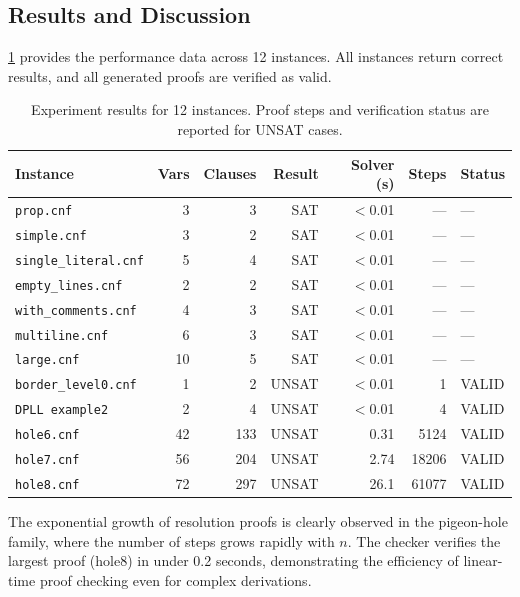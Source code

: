 \documentclass{article}
\begin{document}
\subsection{Results and Discussion}

\cref{tab:results} provides the performance data across 12 instances.
All instances return correct results, and all generated proofs are
verified as valid.

\begin{table}[htb]
\centering
\caption{Experiment results for 12 instances. Proof steps and
verification status are reported for UNSAT cases.}
\label{tab:results}
\begin{tabular}{lrrrrrl}
\toprule
Instance & Vars & Clauses & Result & Solver (s) & Steps & Status \\
\midrule
\texttt{prop.cnf}            &  3 &    3 & SAT   & $<$0.01 & ---      & ---   \\
\texttt{simple.cnf}          &  3 &    2 & SAT   & $<$0.01 & ---      & ---   \\
\texttt{single\_literal.cnf} &  5 &    4 & SAT   & $<$0.01 & ---      & ---   \\
\texttt{empty\_lines.cnf}    &  2 &    2 & SAT   & $<$0.01 & ---      & ---   \\
\texttt{with\_comments.cnf}  &  4 &    3 & SAT   & $<$0.01 & ---      & ---   \\
\texttt{multiline.cnf}       &  6 &    3 & SAT   & $<$0.01 & ---      & ---   \\
\texttt{large.cnf}           & 10 &    5 & SAT   & $<$0.01 & ---      & ---   \\
\texttt{border\_level0.cnf}  &  1 &    2 & UNSAT & $<$0.01 & 1        & VALID \\
\texttt{DPLL example2}       &  2 &    4 & UNSAT & $<$0.01 & 4        & VALID \\
\texttt{hole6.cnf}           & 42 &  133 & UNSAT & 0.31    & 5124     & VALID \\
\texttt{hole7.cnf}           & 56 &  204 & UNSAT & 2.74    & 18206    & VALID \\
\texttt{hole8.cnf}           & 72 &  297 & UNSAT & 26.1    & 61077    & VALID \\
\bottomrule
\end{tabular}
\end{table}

The exponential growth of resolution proofs is clearly observed in
the pigeon-hole family, where the number of steps grows rapidly
with $n$.
The checker verifies the largest proof (hole8) in under 0.2 seconds,
demonstrating the efficiency of linear-time proof checking even for
complex derivations.
\end{document}
